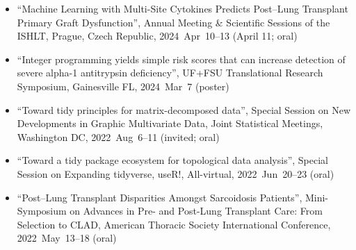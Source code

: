 \documentclass[10pt,a4paper]{article}
\begin{document}
\begin{itemize}[label=$\circ$,nolistsep]
\item
``Machine Learning with Multi-Site Cytokines Predicts Post--Lung Transplant Primary Graft Dysfunction'', Annual Meeting \& Scientific Sessions of the ISHLT, Prague, Czech Republic, 2024~Apr~10--13 (April 11; oral)
\item
``Integer programming yields simple risk scores that can increase detection of severe alpha-1 antitrypsin deficiency'', UF+FSU Translational Research Symposium, Gainesville FL, 2024~Mar~7 (poster)
\item
``Toward tidy principles for matrix-decomposed data'', Special Session on New Developments in Graphic Multivariate Data, Joint Statistical Meetings, Washington DC, 2022~Aug~6--11 (invited; oral)
\item
``Toward a tidy package ecosystem for topological data analysis'', Special Session on Expanding {\sffamily tidyverse}, useR!, All-virtual, 2022~Jun~20--23 (oral)
\item
``Post--Lung Transplant Disparities Amongst Sarcoidosis Patients'', Mini-Symposium on Advances in Pre- and Post-Lung Transplant Care: From Selection to CLAD, American Thoracic Society International Conference, 2022~May~13--18 (oral)

\end{itemize}
\end{document}

